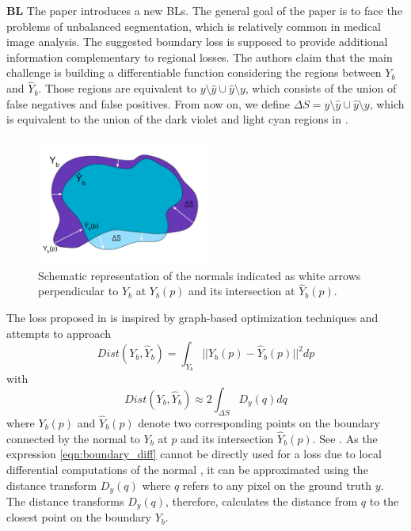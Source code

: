 \textbf{\acf{BL}}\newline
\label{subsubsec:boundary_loss}
The paper \cite{Kervadec_2021} introduces a new \acp{BL}. The general goal of the paper is to face the problems of unbalanced segmentation, which is relatively common in medical image analysis. The suggested boundary loss is supposed to provide additional information complementary to regional losses. The authors claim that the main challenge is building a differentiable function considering the regions between $Y_b$ and $\hat{Y}_b$. Those regions are equivalent to $y\setminus\hat{y}\cup\hat{y}\setminus y$, which consists of the union of false negatives and false positives. From now on, we define $\Delta S=y\setminus\hat{y}\cup\hat{y}\setminus y$, which is equivalent to the union of the \textcolor{rwuviolet}{dark violet} and \textcolor{rwucyanlight}{light cyan regions} in .
\begin{figure}[H]%
    \centering
    \includegraphics[width=0.5\textwidth]{images/BoundaryDiff.png}
    \caption[Boundary normals]{Schematic representation of the normals indicated as white arrows perpendicular to $Y_b$ at $Y_b(p)$ and its intersection at $\hat{Y}_b(p)$.}
    \label{BoundaryDiff}
\end{figure}
The loss proposed in \cite{Kervadec_2021} is inspired by graph-based optimization techniques \cite{boykov2006integral} and attempts to approach
\begin{equation}
    Dist(Y_b,\hat{Y}_b)=\int_{Y_b}||Y_b(p)-\hat{Y}_b(p)||^2 dp
    \label{eqn:boundary_diff}
\end{equation}
with
\begin{equation}
    Dist(Y_b,\hat{Y}_b)\approx 2\int_{\Delta S}D_y(q)dq
\end{equation}
where $Y_b(p)$ and $\hat{Y}_b(p)$ denote two corresponding points on the boundary connected by the normal to $Y_b$ at $p$ and its intersection $\hat{Y}_b(p)$. See . As the expression \ref{eqn:boundary_diff} cannot be directly used for a loss due to local differential computations of the normal \cite{Kervadec_2021}, it can be approximated using the distance transform $D_y(q)$ where $q$ refers to any pixel on the ground truth $y$. The distance transforms $D_y(q)$, therefore, calculates the distance from $q$ to the closest point on the boundary $Y_b$.

